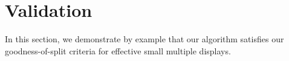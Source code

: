 \section{Validation}
\label{sec:evaluation}
In this section, we demonstrate by example that our algorithm satisfies our goodness-of-split criteria for effective small multiple displays.

%

